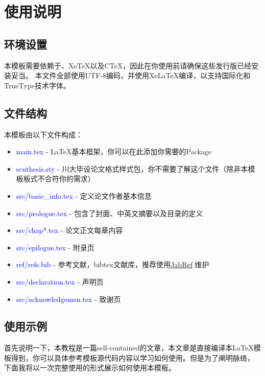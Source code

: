 	\chapter{使用说明}
	
	
	\section{环境设置}
	本模板需要依赖于\LaTeXe 、Xe\TeX 以及C\TeX ，因此在你使用前请确保这些发行版已经安装妥当。
	本文件全部使用UTF-8编码，并使用Xe\LaTeX 编译，以支持国际化和TrueType技术字体。


	\section{文件结构}
	本模板由以下文件构成：
	\begin{itemize}
	\item \textcolor{blue}{main.tex} - \LaTeX 基本框架，你可以在此添加你需要的Package
	\item \textcolor{blue}{scuthesis.sty} - 川大毕设论文格式样式包，你不需要了解这个文件（除非本模板板式不合符你的需求）
	\item \textcolor{blue}{src/basic\_info.tex} - 定义论文作者基本信息
	\item \textcolor{blue}{src/prologue.tex} - 包含了封面、中英文摘要以及目录的定义
	\item \textcolor{blue}{src/chap*.tex} - 论文正文每章内容
	\item \textcolor{blue}{src/epilogue.tex} - 附录页
	\item \textcolor{blue}{ref/refs.bib} - 参考文献，bibtex文献库，推荐使用\href{http://jabref.sourceforge.net/}{JabRef} 维护
	\item \textcolor{blue}{src/declaration.tex} - 声明页
	\item \textcolor{blue}{src/acknowledgemen.tex} - 致谢页
	 
	\end{itemize}


	\section{使用示例}
	首先说明一下，本教程是一篇self-contained的文章，本文章是直接编译本\LaTeX 模板得到，你可以具体参考模板源代码内容以学习如何使用。但是为了阐明脉络， 下面我将以一次完整使用的形式展示如何使用本模板。
	
